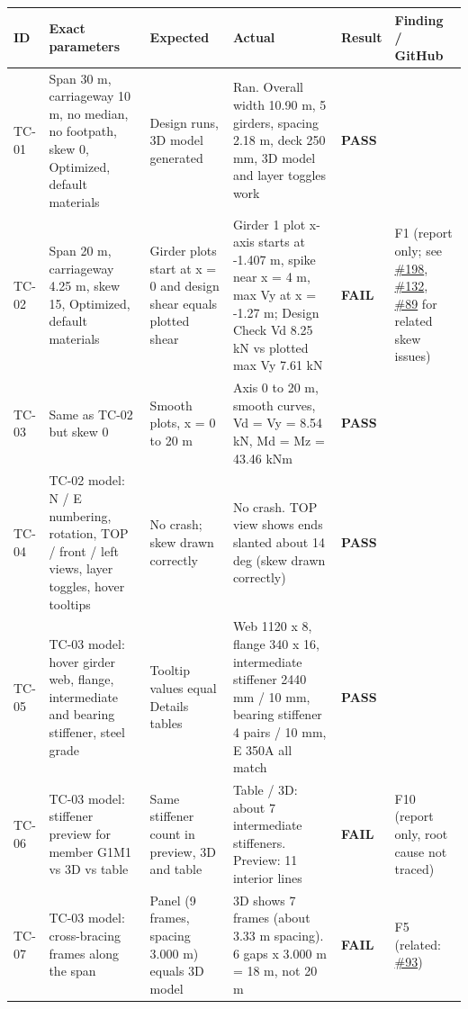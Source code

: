 \documentclass[10pt,a4paper]{article}
\begin{document}
{\small
\begin{longtable}{|p{1.2cm}|p{6.2cm}|p{3.6cm}|p{7.2cm}|p{1.8cm}|p{3.6cm}|}
\hline \textbf{ID} & \textbf{Exact parameters} & \textbf{Expected} & \textbf{Actual} & \textbf{Result} & \textbf{Finding / GitHub} \\ \hline \endhead
TC-01 & Span 30 m, carriageway 10 m, no median, no footpath, skew 0, Optimized, default materials & Design runs, 3D model generated & Ran. Overall width 10.90 m, 5 girders, spacing 2.18 m, deck 250 mm, 3D model and layer toggles work & \textcolor{passc}{\textbf{PASS}} &  \\ \hline
TC-02 & Span 20 m, carriageway 4.25 m, skew 15, Optimized, default materials & Girder plots start at x = 0 and design shear equals plotted shear & Girder 1 plot x-axis starts at -1.407 m, spike near x = 4 m, max Vy at x = -1.27 m; Design Check Vd 8.25 kN vs plotted max Vy 7.61 kN & \textcolor{failc}{\textbf{FAIL}} & F1 (report only; see \href{https://github.com/Nidhikhare12/OsdagBridge/issues/198}{\#198}, \href{https://github.com/Nidhikhare12/OsdagBridge/issues/132}{\#132}, \href{https://github.com/Nidhikhare12/OsdagBridge/issues/89}{\#89} for related skew issues) \\ \hline
TC-03 & Same as TC-02 but skew 0 & Smooth plots, x = 0 to 20 m & Axis 0 to 20 m, smooth curves, Vd = Vy = 8.54 kN, Md = Mz = 43.46 kNm & \textcolor{passc}{\textbf{PASS}} &  \\ \hline
TC-04 & TC-02 model: N / E numbering, rotation, TOP / front / left views, layer toggles, hover tooltips & No crash; skew drawn correctly & No crash. TOP view shows ends slanted about 14 deg (skew drawn correctly) & \textcolor{passc}{\textbf{PASS}} &  \\ \hline
TC-05 & TC-03 model: hover girder web, flange, intermediate and bearing stiffener, steel grade & Tooltip values equal Details tables & Web 1120 x 8, flange 340 x 16, intermediate stiffener 2440 mm / 10 mm, bearing stiffener 4 pairs / 10 mm, E 350A all match & \textcolor{passc}{\textbf{PASS}} &  \\ \hline
TC-06 & TC-03 model: stiffener preview for member G1M1 vs 3D vs table & Same stiffener count in preview, 3D and table & Table / 3D: about 7 intermediate stiffeners. Preview: 11 interior lines & \textcolor{failc}{\textbf{FAIL}} & F10 (report only, root cause not traced) \\ \hline
TC-07 & TC-03 model: cross-bracing frames along the span & Panel (9 frames, spacing 3.000 m) equals 3D model & 3D shows 7 frames (about 3.33 m spacing). 6 gaps x 3.000 m = 18 m, not 20 m & \textcolor{failc}{\textbf{FAIL}} & F5 (related: \href{https://github.com/Nidhikhare12/OsdagBridge/issues/93}{\#93}) \\ \hline

\end{longtable}}
\end{document}
